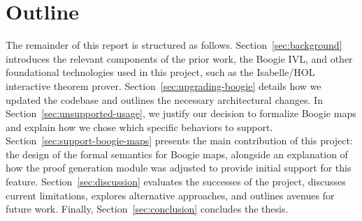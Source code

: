 \section{Outline}
The remainder of this report is structured as follows.
Section~\ref{sec:background} introduces the relevant components of the prior work, the Boogie IVL,
and other foundational technologies used in this project, such as the Isabelle/HOL interactive theorem prover. 
Section~\ref{sec:upgrading-boogie} details how we updated the codebase and outlines the necessary architectural changes. 
In Section~\ref{sec:unsupported-usage}, we justify our decision to formalize Boogie maps and explain how we chose which specific behaviors to support. 
Section~\ref{sec:support-boogie-maps} presents the main contribution of this project:
the design of the formal semantics for Boogie maps, alongside an explanation of
how the proof generation module was adjusted to provide initial support for this feature. 
Section~\ref{sec:discussion} evaluates the successes of the project,
discusses current limitations, explores alternative approaches, and outlines avenues for future work. 
Finally, Section~\ref{sec:conclusion} concludes the thesis.
